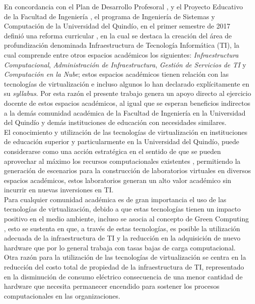 En concordancia con el Plan de Desarrollo Profesoral \parencite{UQPlanDesarrolloPro2016},  y el Proyecto Educativo de la Facultad de Ingeniería \parencite{UQProyectoEducativoFacultad}, el programa de Ingeniería de Sistemas y Computación de la Universidad del Quindío, en el primer semestre de 2017 definió una reforma curricular \parencite{UQACA075}, en la cual se destaca la creación del área de profundización denominada Infraestructura de Tecnología Informática (TI), la cual comprende entre otros espacios académicos los siguientes: \textit{Infraestructura Computacional}, \textit{Administración de Infraestructura}, \textit{Gestión de Servicios de TI } y \textit{Computación en la Nube}; estos espacios académicos tienen relación con las tecnologías de virtualización e incluso algunos lo han declarado explícitamente en su \textit{syllabus}. Por esta razón el presente trabajo genera un apoyo directo al ejercicio docente de estos espacios académicos, al igual que se esperan beneficios indirectos a la demás comunidad académica de la Facultad de Ingeniería en la Universidad del Quindío y demás instituciones de educación con necesidades similares.\\

El conocimiento y utilización de las tecnologías de virtualización en instituciones de educación superior y particularmente en la Universidad del Quindío, puede considerarse como una acción estratégica en el sentido de que se pueden aprovechar al máximo los recursos computacionales existentes \parencite{Klement2017}, permitiendo la generación de escenarios para la construcción de laboratorios virtuales en diversos espacios académicos, estos laboratorios generan un alto valor académico sin incurrir en nuevas inversiones en TI.
\\

Para cualquier comunidad académica es de gran importancia el uso de las tecnologías de virtualización, debido a que estas tecnologías tienen un impacto positivo en el medio ambiente, incluso se asocia al concepto de Green Computing \parencite{Thathera2015}, esto se sustenta en que, a través de estas tecnologías, es posible la utilización adecuada de la infraestructura de TI y la reducción en la adquisición de nuevo hardware que por lo general trabaja con tasas bajas de carga computacional. Otra razón para la utilización de las tecnologías de virtualización se centra en la reducción del costo total de propiedad de la infraestructura de TI, representado en la disminución de consumo eléctrico consecuencia de una menor cantidad de hardware que necesita permanecer encendido para sostener los procesos computacionales en las organizaciones. \\

